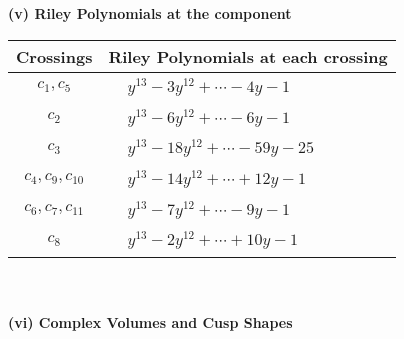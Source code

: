 \documentclass[1p]{elsarticle_modified}
\theoremstyle{definition}
\begin{document}
\newpage\renewcommand{\arraystretch}{1}
\flushleft \textbf{(v) Riley Polynomials at the component}\newline \\
\begin{tabular}{m{50pt}|m{274pt}}
Crossings & \hspace{64pt}Riley Polynomials at each crossing \\
\hline $$\begin{aligned}c_{1},c_{5}\end{aligned}$$&$\begin{aligned}
&y^{13}-3 y^{12}+\cdots-4 y-1
\end{aligned}$\\
\hline $$\begin{aligned}c_{2}\end{aligned}$$&$\begin{aligned}
&y^{13}-6 y^{12}+\cdots-6 y-1
\end{aligned}$\\
\hline $$\begin{aligned}c_{3}\end{aligned}$$&$\begin{aligned}
&y^{13}-18 y^{12}+\cdots-59 y-25
\end{aligned}$\\
\hline $$\begin{aligned}c_{4},c_{9},c_{10}\end{aligned}$$&$\begin{aligned}
&y^{13}-14 y^{12}+\cdots+12 y-1
\end{aligned}$\\
\hline $$\begin{aligned}c_{6},c_{7},c_{11}\end{aligned}$$&$\begin{aligned}
&y^{13}-7 y^{12}+\cdots-9 y-1
\end{aligned}$\\
\hline $$\begin{aligned}c_{8}\end{aligned}$$&$\begin{aligned}
&y^{13}-2 y^{12}+\cdots+10 y-1
\end{aligned}$\\
\hline
\end{tabular}\\~\\
\newpage\flushleft \textbf{(vi) Complex Volumes and Cusp Shapes}
\end{document}
